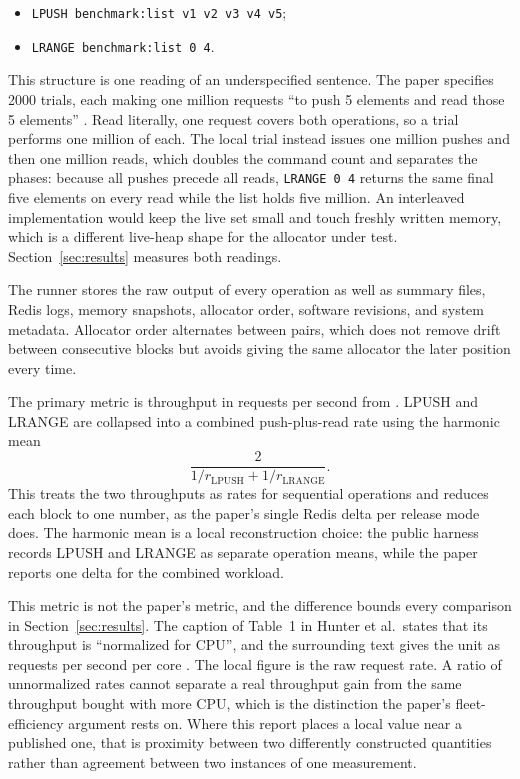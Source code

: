 \documentclass[sigconf]{acmart}
\DeclareRobustCommand{\code}[1]{\path{#1}}
\begin{document}
\begin{itemize}
\item \texttt{LPUSH benchmark:list v1 v2 v3 v4 v5};
\item \texttt{LRANGE benchmark:list 0 4}.
\end{itemize}

This structure is one reading of an underspecified sentence. The paper
specifies 2000 trials, each making one million requests ``to push 5 elements
and read those 5 elements'' \cite{273711}. Read literally, one request covers
both operations, so a trial performs one million of each. The local trial
instead issues one million pushes and then one million reads, which doubles
the command count and separates the phases: because all pushes precede all
reads, \texttt{LRANGE 0 4} returns the same final five elements on every read
while the list holds five million. An interleaved implementation would keep
the live set small and touch freshly written memory, which is a different
live-heap shape for the allocator under test. Section~\ref{sec:results}
measures both readings.

The runner stores the raw output of every operation as well as summary files,
Redis logs, memory snapshots, allocator order, software revisions, and system
metadata. Allocator order alternates between pairs, which does not remove
drift between consecutive blocks but avoids giving the same allocator the
later position every time.

The primary metric is throughput in requests per second from
\code{redis-benchmark}. LPUSH and LRANGE are collapsed into a combined
push-plus-read rate using the harmonic mean
\[
  \frac{2}{1/r_{\mathrm{LPUSH}} + 1/r_{\mathrm{LRANGE}}}.
\]
This treats the two throughputs as rates for sequential operations and reduces
each block to one number, as the paper's single Redis delta per release mode
does. The harmonic mean is a local reconstruction choice: the public \code{redis-benchmark} harness records LPUSH and LRANGE as separate operation means, while
the paper reports one delta for the combined workload.

This metric is not the paper's metric, and the difference bounds every
comparison in Section~\ref{sec:results}. The caption of Table~1 in Hunter et
al.\ states that its throughput is ``normalized for CPU'', and the surrounding
text gives the unit as requests per second per core \cite{273711}. The local
figure is the raw request rate. A ratio of unnormalized rates cannot separate
a real throughput gain from the same throughput bought with more CPU, which is
the distinction the paper's fleet-efficiency argument rests on. Where this
report places a local value near a published one, that is proximity between
two differently constructed quantities rather than agreement between two
instances of one measurement.
\end{document}
